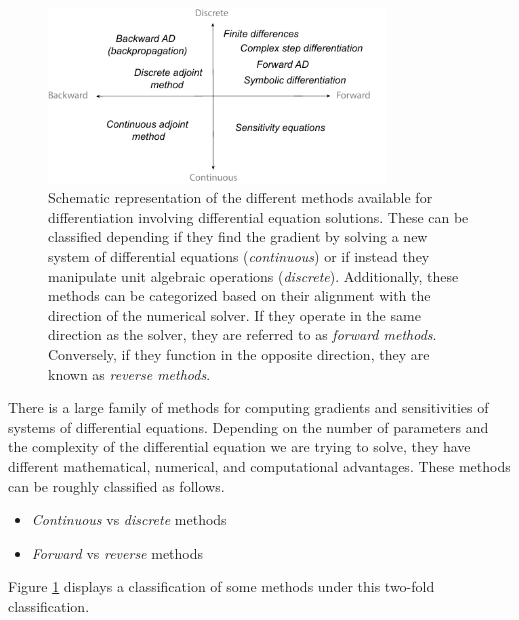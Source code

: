 \begin{figure}[t]
    \centering
    \includegraphics[width=0.80\textwidth]{figures/scheme-methods.pdf}
    \caption{Schematic representation of the different methods available for differentiation involving differential equation solutions. These can be classified depending if they find the gradient by solving a new system of differential equations (\textit{continuous}) or if instead they manipulate unit algebraic operations (\textit{discrete}). Additionally, these methods can be categorized based on their alignment with the direction of the numerical solver. If they operate in the same direction as the solver, they are referred to as \textit{forward methods}. Conversely, if they function in the opposite direction, they are known as \textit{reverse methods}.}
    \label{fig:scheme-all-methods}
\end{figure}

There is a large family of methods for computing gradients and sensitivities of systems of differential equations. 
Depending on the number of parameters and the complexity of the differential equation we are trying to solve, they have different mathematical, numerical, and computational advantages.
These methods can be roughly classified as  follows\cite{ma2021comparison}. 
\begin{itemize}
    \item \textit{Continuous} vs \textit{discrete}  methods
    \item \textit{Forward} vs \textit{reverse} methods
\end{itemize}
Figure \ref{fig:scheme-all-methods} displays a classification of some methods under this two-fold classification. 

